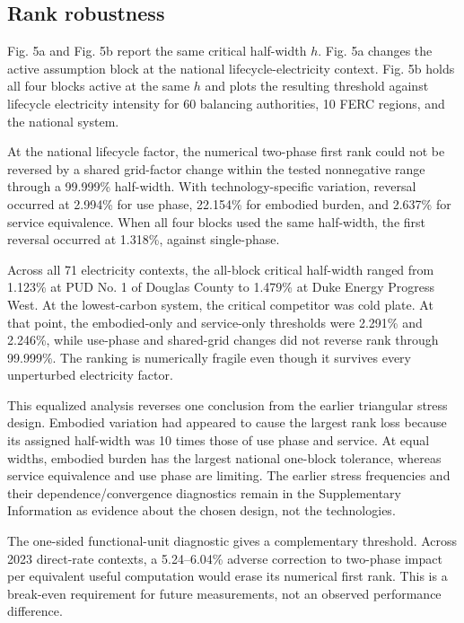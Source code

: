 \documentclass[review,a4paper,fleqn]{cas-sc}
\begin{document}
\subsection{Rank robustness}
Fig. 5a and Fig. 5b report the same critical half-width $h$. Fig. 5a changes the active assumption block at the national lifecycle-electricity context. Fig. 5b holds all four blocks active at the same $h$ and plots the resulting threshold against lifecycle electricity intensity for 60 balancing authorities, 10 FERC regions, and the national system.

At the national lifecycle factor, the numerical two-phase first rank could not be reversed by a shared grid-factor change within the tested nonnegative range through a 99.999\% half-width. With technology-specific variation, reversal occurred at 2.994\% for use phase, 22.154\% for embodied burden, and 2.637\% for service equivalence. When all four blocks used the same half-width, the first reversal occurred at 1.318\%, against single-phase.

Across all 71 electricity contexts, the all-block critical half-width ranged from 1.123\% at PUD No. 1 of Douglas County to 1.479\% at Duke Energy Progress West. At the lowest-carbon system, the critical competitor was cold plate. At that point, the embodied-only and service-only thresholds were 2.291\% and 2.246\%, while use-phase and shared-grid changes did not reverse rank through 99.999\%. The ranking is numerically fragile even though it survives every unperturbed electricity factor.

This equalized analysis reverses one conclusion from the earlier triangular stress design. Embodied variation had appeared to cause the largest rank loss because its assigned half-width was 10 times those of use phase and service. At equal widths, embodied burden has the largest national one-block tolerance, whereas service equivalence and use phase are limiting. The earlier stress frequencies and their dependence/convergence diagnostics remain in the Supplementary Information as evidence about the chosen design, not the technologies.

The one-sided functional-unit diagnostic gives a complementary threshold. Across 2023 direct-rate contexts, a 5.24--6.04\% adverse correction to two-phase impact per equivalent useful computation would erase its numerical first rank. This is a break-even requirement for future measurements, not an observed performance difference.
\end{document}
